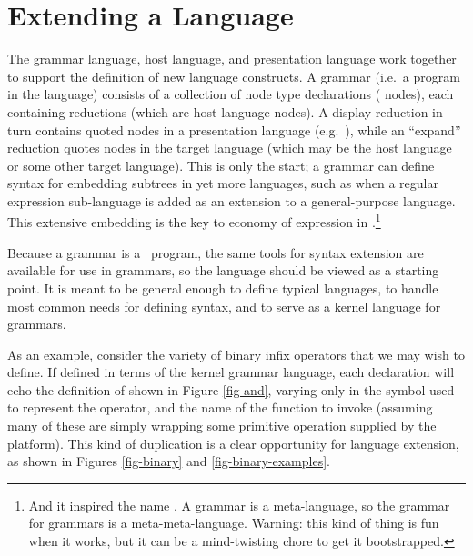 %
%

\section{Extending a Language}
The grammar language, host language, and presentation language work together to support the definition of new language constructs. A grammar (i.e.\ a program in the  language) consists of a collection of node type declarations ( nodes), each containing reductions (which are host language nodes). A display reduction in turn contains quoted nodes in a presentation language (e.g.\ ), while an ``expand'' reduction quotes nodes in the target language (which may be the host language or some other target language). This is only the start; a grammar can define syntax for embedding subtrees in yet more languages, such as when a regular expression sub-language is added as an extension to a general-purpose language. This extensive embedding is the key to economy of expression in \Meta.\footnote{And it inspired the name \Meta. A grammar is a meta-language, so the grammar for grammars is a meta-meta-language. Warning: this kind of thing is fun when it works, but it can be a mind-twisting chore to get it bootstrapped.}


Because a grammar is a \Meta\ program, the same tools for syntax extension are available for use in grammars, so the  language should be viewed as a starting point. It is meant to be general enough to define typical languages, to handle most common needs for defining syntax, and to serve as a kernel language for grammars.

As an example, consider the variety of binary infix operators that we may wish to define. If defined in terms of the kernel grammar language, each declaration will echo the definition of  shown in Figure \ref{fig-and}, varying only in the symbol used to represent the operator, and the name of the function to invoke (assuming many of these are simply wrapping some primitive operation supplied by the platform). This kind of duplication is a clear opportunity for language extension, as shown in Figures \ref{fig-binary} and \ref{fig-binary-examples}.


